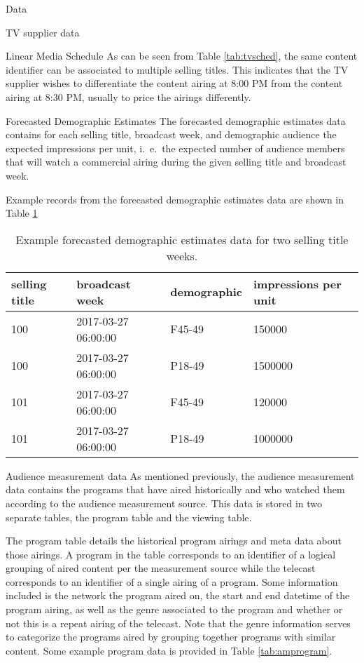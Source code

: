 \begin{chapter}{Data}
\begin{section}{TV supplier data}
\begin{subsection}{Linear Media Schedule}
    As can be seen from Table \ref{tab:tvsched}, the same content identifier can be associated
    to multiple selling titles. This indicates that the TV supplier wishes to differentiate
    the content airing at 8:00 PM from the content airing at 8:30 PM, usually to price the airings differently.

  \end{subsection}

  \begin{subsection}{Forecasted Demographic Estimates}
    The forecasted demographic estimates data contains for each
    selling title, broadcast week, and demographic audience the expected impressions per unit, i.\ e.\
    the expected number of audience members that will watch a commercial airing during the given selling title and broadcast week.


    Example records from the forecasted demographic estimates data are shown in Table \ref{tab:tvdem}

    \begin{table}[h!]
      \centering
        \begin{tabular}{llll}
          selling title & broadcast week & demographic & impressions per unit \\
          \hline
          100 & 2017-03-27 06:00:00 & F45-49 & 150000 \\
          100 & 2017-03-27 06:00:00 & P18-49 & 1500000 \\
          101 & 2017-03-27 06:00:00 & F45-49 & 120000 \\
          101 & 2017-03-27 06:00:00 & P18-49 & 1000000 \\
        \end{tabular}
      \caption{Example forecasted demographic estimates data for two selling title weeks.}\label{tab:tvdem}
    \end{table}
  \end{subsection}
\end{section}


\begin{section}{Audience measurement data}
  As mentioned previously, the audience measurement data contains the programs that
  have aired historically and who watched them according to the audience measurement source.
  This data is stored in two separate tables, the program table and the viewing table.

  The program table details the historical program airings and meta data about those airings.
  A program in the table corresponds to an identifier of a logical grouping of
  aired content per the measurement source while the telecast corresponds
  to an identifier of a single airing of a program.
  Some information included is the network the program aired on, the start and end datetime of the
  program airing, as well as the genre associated to the program and whether or not this is a repeat airing of the telecast.
  Note that the genre information serves to categorize the programs aired by grouping together
  programs with similar content.
  Some example program data is provided in Table \ref{tab:amprogram}.


\end{section}
\end{chapter}
